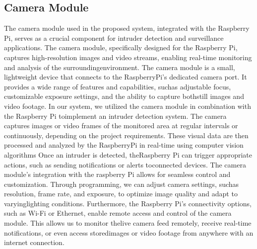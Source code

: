 \documentclass[letterpaper, 10 pt, conference]{ieeeconf}  %
\begin{document}
\subsection{Camera Module}
The camera module used in the proposed system, integrated with the Raspberry Pi, serves as a crucial component for intruder detection and surveillance applications. The camera module, specifically designed for the Raspberry Pi, captures high-resolution images
and video streams, enabling real-time monitoring and analysis of the surroundingenvironment. The camera module is a small, lightweight device that connects to the RaspberryPi’s
dedicated camera port. It provides a wide range of features and capabilities, suchas
adjustable focus, customizable exposure settings, and the ability to capture bothstill
images and video footage. In our system, we utilized the camera module in combination with the Raspberry Pi toimplement an intruder detection system. The camera captures images or video frames
of the monitored area at regular intervals or continuously, depending on the project
requirements. These visual data are then processed and analyzed by the RaspberryPi
in real-time using computer vision algorithms Once an intruder is detected, theRaspberry Pi can trigger appropriate actions, such as sending notifications or alerts toconnected devices. The camera module’s integration with the raspberry Pi allows for seamless control
and customization. Through programming, we can adjust camera settings, suchas
resolution, frame rate, and exposure, to optimize image quality and adapt to varyinglighting conditions. Furthermore, the Raspberry Pi’s connectivity options, such as Wi-Fi or Ethernet, enable remote access and control of the camera module. This allows us to monitor thelive camera feed remotely, receive real-time notifications, or even access storedimages or video footage from anywhere with an internet connection.
\end{document}
